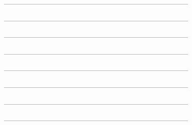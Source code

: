 --------------------------------------------------------------------------------



--------------------------------------------------------------------------------



--------------------------------------------------------------------------------



--------------------------------------------------------------------------------



--------------------------------------------------------------------------------



--------------------------------------------------------------------------------



--------------------------------------------------------------------------------



--------------------------------------------------------------------------------
